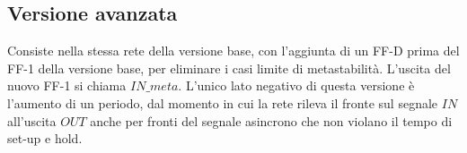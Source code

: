 \documentclass{article}
\begin{document}
\subsection{Versione avanzata}

Consiste nella stessa rete della versione base, con l'aggiunta di un FF-D prima del FF-1 della versione base, per eliminare i casi limite di metastabilità.
L'uscita del nuovo FF-1 si chiama $IN\_meta$.
L'unico lato negativo di questa versione è l'aumento di un periodo, dal momento in cui la rete rileva il fronte sul segnale $IN$ all'uscita $OUT$ anche per fronti del segnale asincrono che non violano il tempo di set-up e hold.
\end{document}

